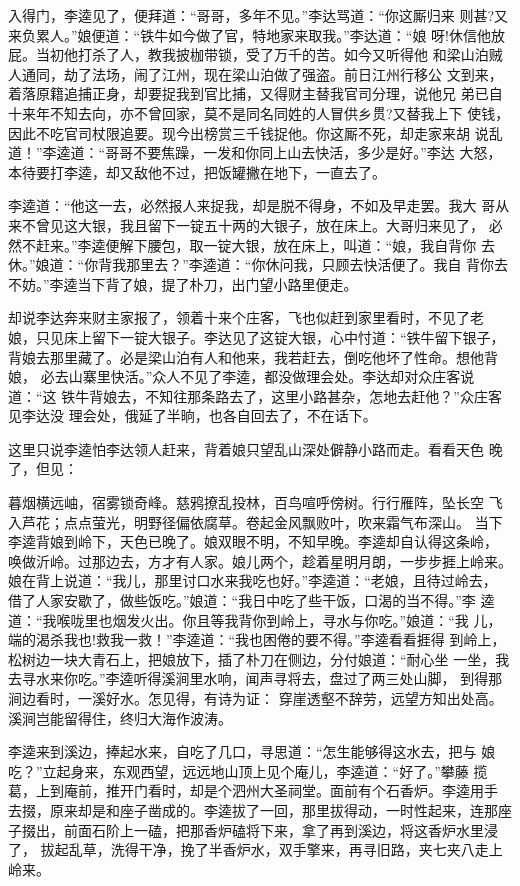 入得门，李逵见了，便拜道：“哥哥，多年不见。”李达骂道：“你这厮归来
则甚?又来负累人。”娘便道：“铁牛如今做了官，特地家来取我。”李达道：“娘
呀!休信他放屁。当初他打杀了人，教我披枷带锁，受了万千的苦。如今又听得他
和梁山泊贼人通同，劫了法场，闹了江州，现在梁山泊做了强盗。前日江州行移公
文到来，着落原籍追捕正身，却要捉我到官比捕，又得财主替我官司分理，说他兄
弟已自十来年不知去向，亦不曾回家，莫不是同名同姓的人冒供乡贯?又替我上下
使钱，因此不吃官司杖限追要。现今出榜赏三千钱捉他。你这厮不死，却走家来胡
说乱道！”李逵道：“哥哥不要焦躁，一发和你同上山去快活，多少是好。”李达
大怒，本待要打李逵，却又敌他不过，把饭罐撇在地下，一直去了。

李逵道：“他这一去，必然报人来捉我，却是脱不得身，不如及早走罢。我大
哥从来不曾见这大银，我且留下一锭五十两的大银子，放在床上。大哥归来见了，
必然不赶来。”李逵便解下腰包，取一锭大银，放在床上，叫道：“娘，我自背你
去休。”娘道：“你背我那里去？”李逵道：“你休问我，只顾去快活便了。我自
背你去不妨。”李逵当下背了娘，提了朴刀，出门望小路里便走。

却说李达奔来财主家报了，领着十来个庄客，飞也似赶到家里看时，不见了老
娘，只见床上留下一锭大银子。李达见了这锭大银，心中忖道：“铁牛留下银子，
背娘去那里藏了。必是梁山泊有人和他来，我若赶去，倒吃他坏了性命。想他背娘，
必去山寨里快活。”众人不见了李逵，都没做理会处。李达却对众庄客说道：“这
铁牛背娘去，不知往那条路去了，这里小路甚杂，怎地去赶他？”众庄客见李达没
理会处，俄延了半晌，也各自回去了，不在话下。

这里只说李逵怕李达领人赶来，背着娘只望乱山深处僻静小路而走。看看天色
晚了，但见：

暮烟横远岫，宿雾锁奇峰。慈鸦撩乱投林，百鸟喧呼傍树。行行雁阵，坠长空
飞入芦花；点点萤光，明野径偏依腐草。卷起金风飘败叶，吹来霜气布深山。
当下李逵背娘到岭下，天色已晚了。娘双眼不明，不知早晚。李逵却自认得这条岭，
唤做沂岭。过那边去，方才有人家。娘儿两个，趁着星明月朗，一步步捱上岭来。
娘在背上说道：“我儿，那里讨口水来我吃也好。”李逵道：“老娘，且待过岭去，
借了人家安歇了，做些饭吃。”娘道：“我日中吃了些干饭，口渴的当不得。”李
逵道：“我喉咙里也烟发火出。你且等我背你到岭上，寻水与你吃。”娘道：“我
儿，端的渴杀我也!救我一救！”李逵道：“我也困倦的要不得。”李逵看看捱得
到岭上，松树边一块大青石上，把娘放下，插了朴刀在侧边，分付娘道：“耐心坐
一坐，我去寻水来你吃。”李逵听得溪涧里水响，闻声寻将去，盘过了两三处山脚，
到得那涧边看时，一溪好水。怎见得，有诗为证：
穿崖透壑不辞劳，远望方知出处高。
溪涧岂能留得住，终归大海作波涛。

李逵来到溪边，捧起水来，自吃了几口，寻思道：“怎生能够得这水去，把与
娘吃？”立起身来，东观西望，远远地山顶上见个庵儿，李逵道：“好了。”攀藤
揽葛，上到庵前，推开门看时，却是个泗州大圣祠堂。面前有个石香炉。李逵用手
去掇，原来却是和座子凿成的。李逵拔了一回，那里拔得动，一时性起来，连那座
子掇出，前面石阶上一磕，把那香炉磕将下来，拿了再到溪边，将这香炉水里浸了，
拔起乱草，洗得干净，挽了半香炉水，双手擎来，再寻旧路，夹七夹八走上岭来。

